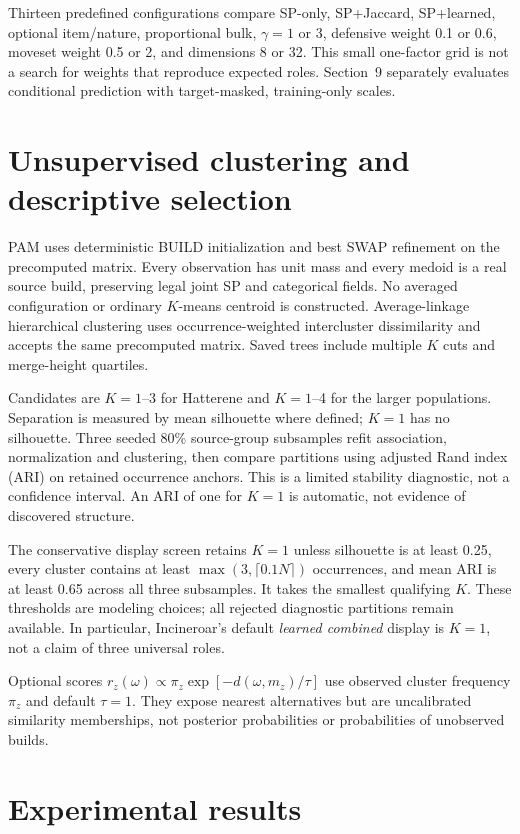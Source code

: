 \documentclass[10pt,a4paper]{article}
\begin{document}
Thirteen predefined configurations compare SP-only, SP+Jaccard, SP+learned, optional item/nature, proportional bulk, $\gamma=1$ or 3, defensive weight 0.1 or 0.6, moveset weight 0.5 or 2, and dimensions 8 or 32. This small one-factor grid is not a search for weights that reproduce expected roles. Section~9 separately evaluates conditional prediction with target-masked, training-only scales.

\section{Unsupervised clustering and descriptive selection}
PAM uses deterministic BUILD initialization and best SWAP refinement on the precomputed matrix. Every observation has unit mass and every medoid is a real source build, preserving legal joint SP and categorical fields. No averaged configuration or ordinary $K$-means centroid is constructed. Average-linkage hierarchical clustering uses occurrence-weighted intercluster dissimilarity and accepts the same precomputed matrix. Saved trees include multiple $K$ cuts and merge-height quartiles.

Candidates are $K=1$--3 for Hatterene and $K=1$--4 for the larger populations. Separation is measured by mean silhouette where defined; $K=1$ has no silhouette. Three seeded 80\% source-group subsamples refit association, normalization and clustering, then compare partitions using adjusted Rand index (ARI) on retained occurrence anchors. This is a limited stability diagnostic, not a confidence interval. An ARI of one for $K=1$ is automatic, not evidence of discovered structure.

The conservative display screen retains $K=1$ unless silhouette is at least 0.25, every cluster contains at least $\max(3,\lceil0.1N\rceil)$ occurrences, and mean ARI is at least 0.65 across all three subsamples. It takes the smallest qualifying $K$. These thresholds are modeling choices; all rejected diagnostic partitions remain available. In particular, Incineroar's default \emph{learned combined} display is $K=1$, not a claim of three universal roles.

Optional scores $r_z(\omega)\propto\pi_z\exp[-d(\omega,m_z)/\tau]$ use observed cluster frequency $\pi_z$ and default $\tau=1$. They expose nearest alternatives but are uncalibrated similarity memberships, not posterior probabilities or probabilities of unobserved builds.
\clearpage

\section{Experimental results}
\end{document}
